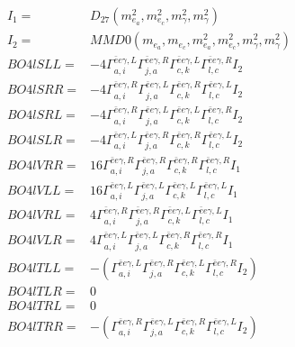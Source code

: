 \documentclass[A4,landscape]{article}
\begin{document}
\begin{align} 
I_1 = & D_{27}(m^2_{e_{{a}}}, m^2_{e_{{c}}}, m^2_{\gamma}, m^2_{\gamma}) \\ 
I_2 = & MMD0(m_{e_{{a}}}, m_{e_{{c}}}, m^2_{e_{{a}}}, m^2_{e_{{c}}}, m^2_{\gamma}, m^2_{\gamma}) \\ 
  BO4lSLL= & -4  \Gamma^{\bar{e}e \gamma ,L}_{a, i} \Gamma^{\bar{e}e \gamma ,R}_{j, a} \Gamma^{\bar{e}e \gamma ,L}_{c, k} \Gamma^{\bar{e}e \gamma ,R}_{l, c} I_2 \\ 
  BO4lSRR= & -4  \Gamma^{\bar{e}e \gamma ,R}_{a, i} \Gamma^{\bar{e}e \gamma ,L}_{j, a} \Gamma^{\bar{e}e \gamma ,R}_{c, k} \Gamma^{\bar{e}e \gamma ,L}_{l, c} I_2 \\ 
  BO4lSRL= & -4  \Gamma^{\bar{e}e \gamma ,R}_{a, i} \Gamma^{\bar{e}e \gamma ,L}_{j, a} \Gamma^{\bar{e}e \gamma ,L}_{c, k} \Gamma^{\bar{e}e \gamma ,R}_{l, c} I_2 \\ 
  BO4lSLR= & -4  \Gamma^{\bar{e}e \gamma ,L}_{a, i} \Gamma^{\bar{e}e \gamma ,R}_{j, a} \Gamma^{\bar{e}e \gamma ,R}_{c, k} \Gamma^{\bar{e}e \gamma ,L}_{l, c} I_2 \\ 
  BO4lVRR= & 16  \Gamma^{\bar{e}e \gamma ,R}_{a, i} \Gamma^{\bar{e}e \gamma ,R}_{j, a} \Gamma^{\bar{e}e \gamma ,R}_{c, k} \Gamma^{\bar{e}e \gamma ,R}_{l, c} I_1 \\ 
  BO4lVLL= & 16  \Gamma^{\bar{e}e \gamma ,L}_{a, i} \Gamma^{\bar{e}e \gamma ,L}_{j, a} \Gamma^{\bar{e}e \gamma ,L}_{c, k} \Gamma^{\bar{e}e \gamma ,L}_{l, c} I_1 \\ 
  BO4lVRL= & 4  \Gamma^{\bar{e}e \gamma ,R}_{a, i} \Gamma^{\bar{e}e \gamma ,R}_{j, a} \Gamma^{\bar{e}e \gamma ,L}_{c, k} \Gamma^{\bar{e}e \gamma ,L}_{l, c} I_1 \\ 
  BO4lVLR= & 4  \Gamma^{\bar{e}e \gamma ,L}_{a, i} \Gamma^{\bar{e}e \gamma ,L}_{j, a} \Gamma^{\bar{e}e \gamma ,R}_{c, k} \Gamma^{\bar{e}e \gamma ,R}_{l, c} I_1 \\ 
  BO4lTLL= & -( \Gamma^{\bar{e}e \gamma ,L}_{a, i} \Gamma^{\bar{e}e \gamma ,R}_{j, a} \Gamma^{\bar{e}e \gamma ,L}_{c, k} \Gamma^{\bar{e}e \gamma ,R}_{l, c} I_2) \\ 
  BO4lTLR= & 0 \\ 
  BO4lTRL= & 0 \\ 
  BO4lTRR= & -( \Gamma^{\bar{e}e \gamma ,R}_{a, i} \Gamma^{\bar{e}e \gamma ,L}_{j, a} \Gamma^{\bar{e}e \gamma ,R}_{c, k} \Gamma^{\bar{e}e \gamma ,L}_{l, c} I_2) \\ 
\end{align} 
\end{document}
